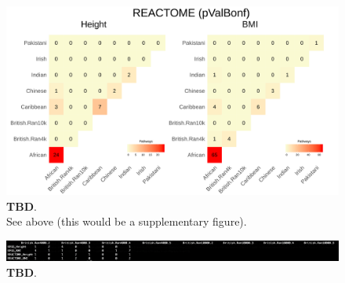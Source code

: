 \documentclass[12pt, a4paper]{article}
\begin{document}
\begin{figure}[htbp]
\centering
\includegraphics[scale=.225]{Images/Supp/InterPath_Supp_Figure_Heatplots_REACTOME_vs1.png}
\caption[TBD]{\textbf{TBD}. \\ See above (this would be a supplementary figure).}
\label{InterPath-Supp-Figure-Heatplots-REACTOME}
\end{figure}
\clearpage


\begin{landscape}
\begin{figure}[htbp]
\centering
\hspace*{-.5cm}
\includegraphics[scale=1]{Images/Supp/InterPath_Supp_Figure_BritReps_Barplot_Temp.png}
\caption[TBD]{\textbf{TBD}. }
\label{InterPath-Supp-Figure-BritReps-Barplots}
\end{figure}
\end{landscape}
\clearpage
\end{document}
